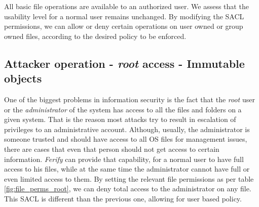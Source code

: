 \par All basic file operations are available to an authorized user. We assess that the usability level for a normal user remains unchanged. By modifying the \ac{SACL} permissions, we can allow or deny certain operations on user owned or group owned files, according to the desired policy to be enforced.

\subsection{Attacker operation - \emph{root} access - Immutable objects}

\par One of the biggest problems in information security is the fact that the \emph{root} user or the \emph{administrator} of the system has access to all the files and folders on a given system. That is the reason most attacks try to result in escalation of privileges to an administrative account. Although, usually, the administrator is someone trusted and should have access to all \ac{OS} files for management issues, there are cases that even that person should not get access to certain information. \emph{Ferify} can provide that capability, for a normal user to have full access to his files, while at the same time the administrator cannot have full or even limited access to them. By setting the relevant file permissions as per table \ref{fig:file_perms_root}, we can deny total access to the administrator on any file. This \ac{SACL} is different than the previous one, allowing for user based policy.

